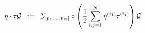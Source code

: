 \begin{equation}
\eta \cdot \tau {\cal{G}} \;\; :=\;\; {\cal{Y}}_{[ p_1 ,..., p_N ]} \circ \left( {1 \over 2} \sum_{i,j =1}^{N} \eta^{(ij)} \tau^{(ij)} \right) {\cal{G}}
\label{eq:x7}
\end{equation}

